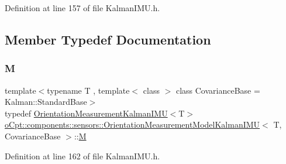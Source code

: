 Definition at line 157 of file Kalman\+I\+M\+U.\+h.



\subsection{Member Typedef Documentation}
\hypertarget{classo_cpt_1_1components_1_1sensors_1_1_orientation_measurement_model_kalman_i_m_u_aa47a5c6cf0a9125a5ed587a7fefef876}{}\label{classo_cpt_1_1components_1_1sensors_1_1_orientation_measurement_model_kalman_i_m_u_aa47a5c6cf0a9125a5ed587a7fefef876} 
\subsubsection{\texorpdfstring{M}{M}}
{\footnotesize\ttfamily template$<$typename T , template$<$ class $>$ class Covariance\+Base = Kalman\+::\+Standard\+Base$>$ \\
typedef \hyperlink{classo_cpt_1_1components_1_1sensors_1_1_orientation_measurement_kalman_i_m_u}{Orientation\+Measurement\+Kalman\+I\+MU}$<$T$>$ \hyperlink{classo_cpt_1_1components_1_1sensors_1_1_orientation_measurement_model_kalman_i_m_u}{o\+Cpt\+::components\+::sensors\+::\+Orientation\+Measurement\+Model\+Kalman\+I\+MU}$<$ T, Covariance\+Base $>$\+::\hyperlink{classo_cpt_1_1components_1_1sensors_1_1_orientation_measurement_model_kalman_i_m_u_aa47a5c6cf0a9125a5ed587a7fefef876}{M}}



Definition at line 162 of file Kalman\+I\+M\+U.\+h.

\hypertarget{classo_cpt_1_1components_1_1sensors_1_1_orientation_measurement_model_kalman_i_m_u_a3104263971226357108cef704d272f90}{}\label{classo_cpt_1_1components_1_1sensors_1_1_orientation_measurement_model_kalman_i_m_u_a3104263971226357108cef704d272f90} 
